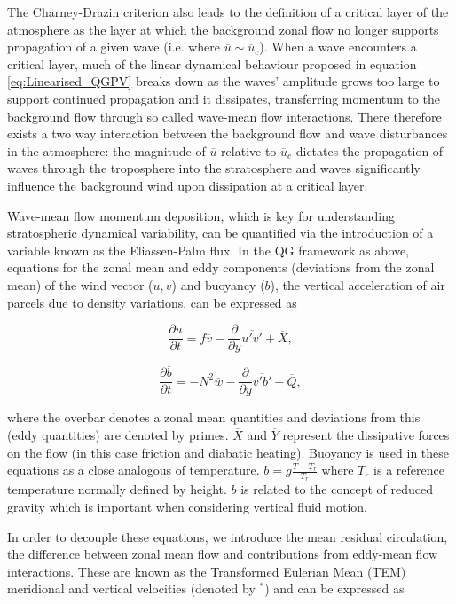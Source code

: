 The Charney-Drazin criterion also leads to the definition of a critical layer of the atmosphere as the layer at which the background zonal flow no longer supports propagation of a given wave (i.e. where $\overline{u} \sim \overline{u}_c$). When a wave encounters a critical layer, much of the linear dynamical behaviour proposed in equation \ref{eq:Linearised_QGPV} breaks down as the waves' amplitude grows too large to support continued propagation and it dissipates, transferring momentum to the background flow through so called wave-mean flow interactions. There therefore exists a two way interaction between the background flow and wave disturbances in the atmosphere: the magnitude of $\overline{u}$ relative to $\overline{u}_c$ dictates the propagation of waves through the troposphere into the stratosphere and waves significantly influence the background wind upon dissipation at a critical layer.

Wave-mean flow momentum deposition, which is key for understanding stratospheric dynamical variability, can be quantified via the introduction of a variable known as the Eliassen-Palm flux. In the QG framework as above, equations for the zonal mean and eddy components (deviations from the zonal mean) of the wind vector ($u, v$) and buoyancy ($b$), the vertical acceleration of air parcels due to density variations, can be expressed as 

\begin{equation} \label{eq:QG_Ubar}
\frac{\partial \overline{u}}{\partial t} = f\overline{v} - \frac{\partial}{\partial y} \overline{u'v'} + \overline{X}, 
\end{equation}

\begin{equation} \label{eq:QG_theta}
\frac{\partial \overline{b}}{\partial t} = -N^2\overline{w} - \frac{\partial}{\partial y} \overline{v'b'} + \overline{Q}, 
\end{equation}

\noindent where the overbar denotes a zonal mean quantities and deviations from this (eddy quantities) are denoted by primes. $\overline{X}$ and $\overline{Y}$ represent the dissipative forces on the flow (in this case friction and diabatic heating). Buoyancy is used in these equations as a close analogous of temperature. $b = g\frac{T - T_r}{T_r}$ where $T_r$ is a reference temperature normally defined by height. $b$ is related to the concept of reduced gravity which is important when considering vertical fluid motion. 

In order to decouple these equations, we introduce the mean residual circulation, the difference between zonal mean flow and contributions from eddy-mean flow interactions. These are known as the Transformed Eulerian Mean (TEM) meridional and vertical velocities \citep{andrewsPlanetary1976} (denoted by $^*$) and can be expressed as 

